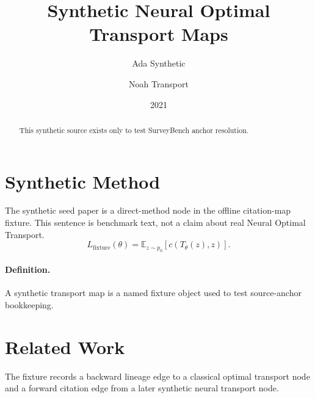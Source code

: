 \documentclass[11pt]{article}
\title{Synthetic Neural Optimal Transport Maps}
\author{Ada Synthetic \and Noah Transport}
\date{2021}
\begin{document}
\maketitle
\begin{abstract}
This synthetic source exists only to test SurveyBench anchor resolution.
\end{abstract}
\section{Synthetic Method}
\label{sec:synthetic-method}
The synthetic seed paper is a direct-method node in the offline citation-map
fixture. This sentence is benchmark text, not a claim about real Neural
Optimal Transport.
\begin{equation}
\label{eq:synthetic-transport-loss}
L_{\mathrm{fixture}}(\theta) =
  \mathbb{E}_{z \sim p_0} \left[c(T_\theta(z), z)\right].
\end{equation}
\paragraph{Definition.}
\label{def:synthetic-map}
A synthetic transport map is a named fixture object used to test source-anchor
bookkeeping.
\section{Related Work}
\label{sec:synthetic-related-work}
The fixture records a backward lineage edge to a classical optimal transport
node and a forward citation edge from a later synthetic neural transport node.
\end{document}
